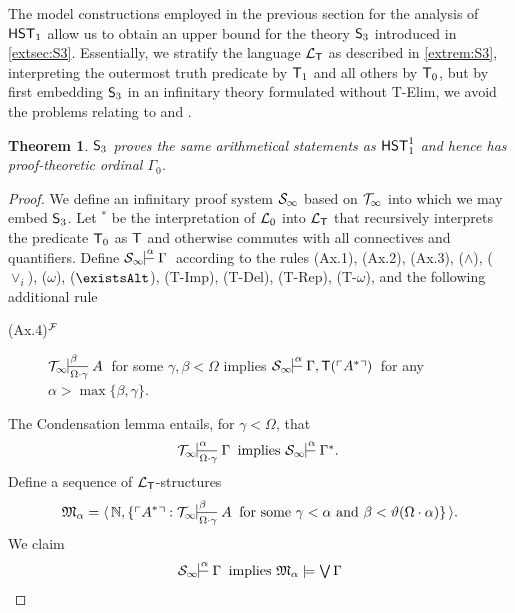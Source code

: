 \documentclass[UKenglish,cleveref,DIV=12]{scrartcl}
\let\exists\existsAlt
\newtheorem{theorem}{Theorem}
\theoremstyle{definition}
\theoremstyle{definition}
\begin{document}
The model constructions employed in the previous section for the analysis of $\mathsf{HST}_1$
allow us to obtain an upper bound for the theory $\mathsf{S}_3$ introduced in
\cref{extsec:S3}. Essentially, we stratify the language $\mathcal{L}_{\mathsf{T}}$ as described in
\cref{extrem:S3}, interpreting the outermost truth predicate by $\mathsf{T}_1$ and all
others by $\mathsf{T}_0$, but by first embedding $\mathsf{S}_3$ in an infinitary theory
formulated without T-Elim, we avoid the problems relating to  and
.
\begin{theorem}\label{extthm:S3strength}
 $\mathsf{S}_3$ proves the same arithmetical statements as $\mathsf{HST}_1^1$ and hence has
proof-theoretic ordinal $\Gamma_0$.
\end{theorem}
\begin{proof}
We define an infinitary proof system $\mathcal{S}_\infty$ based on $\mathcal{T}_\infty$ into
which we may embed $\mathsf{S}_3$. Let $^*$ be the interpretation of $\mathcal{L}_0$ into
$\mathcal{L}_{\mathsf{T}}$ that recursively interprets the predicate $\mathsf{T}_0$ as $\mathsf{T}$ and otherwise
commutes with all connectives and quantifiers. Define $\theoryinf
S\prov\alpha{}\Gamma$ according to the rules (Ax.1), (Ax.2), (Ax.3),
($\land$), ($\lor_i$), ($\omega$), ($\exists$), (T-Imp), (T-Del), (T-Rep), (T-$\omega$), and
the following additional rule
\begin{description}
 \item [\normalfont(Ax.4)$^{\mathcal{F}}$] $\Tinfty\prov\beta{\Omega\cdot\gamma} A$ for some $\gamma,\beta<\Omega$
  implies $\theoryinf S\prov\alpha{}{\Gamma,\T(\gn{A^*})}$ for any \linebreak$\alpha>\max\{\beta,\gamma\}$.
\end{description}
The Condensation lemma entails, for $\gamma<\Omega$, that
\begin{align}\label{eqn:S81}
  \Tinfty\prov\alpha{\Omega\cdot\gamma}\Gamma\text{ implies }\theoryinf S\prov\alpha{}{\Gamma^*.}
\end{align}
%
Define a sequence of $\mathcal{L}_{\mathsf{T}}$-structures
\begin{align*}
  \mathfrak{M}_\alpha=\pair{\N,\{\gn {A^*}:\text{$\Tinfty\prov{\beta}{\Omega\cdot\gamma} A$ for some $\gamma<\alpha$ and $\beta<\vartheta(\Omega\cdot\alpha)$}\}}.
\end{align*}
We claim
\begin{align}\label{eqn:S82}
  \theoryinf S\prov\alpha{}\Gamma\text{ implies }\mathfrak{M}_\alpha\models\textstyle\bigvee\Gamma
\end{align}

\end{proof}
\end{document}
